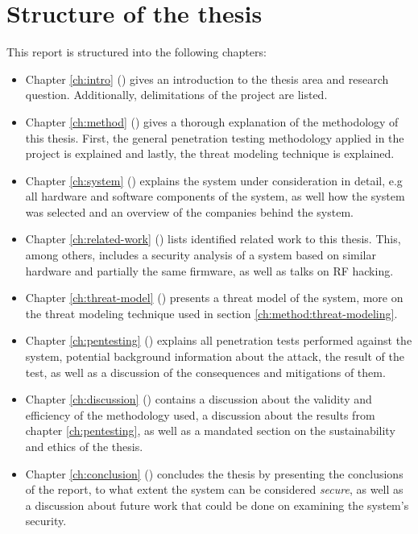 \section{Structure of the thesis} \label{ch:intro:structure}
This report is structured into the following chapters:
\begin{itemize}
    \item Chapter \ref{ch:intro} () gives an introduction to the thesis area and research question. Additionally, delimitations of the project are listed.
    \item Chapter \ref{ch:method} () gives a thorough explanation of the methodology of this thesis. First, the general penetration testing methodology applied in the project is explained and lastly, the threat modeling technique is explained.
    \item Chapter \ref{ch:system} () explains the system under consideration in detail, e.g all hardware and software components of the system, as well how the system was selected and an overview of the companies behind the system.
    \item Chapter \ref{ch:related-work} () lists identified related work to this thesis. This, among others, includes a security analysis of a system based on similar hardware and partially the same firmware, as well as talks on \gls{RF} hacking.
    \item Chapter \ref{ch:threat-model} () presents a threat model of the system, more on the threat modeling technique used in section \ref{ch:method:threat-modeling}.
    \item Chapter \ref{ch:pentesting} () explains all penetration tests performed against the system, potential background information about the attack, the result of the test, as well as a discussion of the consequences and mitigations of them.
    \item Chapter \ref{ch:discussion} () contains a discussion about the validity and efficiency of the methodology used, a discussion about the results from chapter \ref{ch:pentesting}, as well as a mandated section on the sustainability and ethics of the thesis.
    \item Chapter \ref{ch:conclusion} () concludes the thesis by presenting the conclusions of the report, to what extent the system can be considered \textit{secure}, as well as a discussion about future work that could be done on examining the system's security.
\end{itemize}
